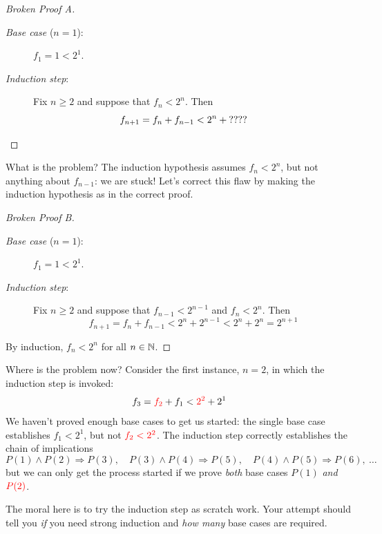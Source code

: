 \begin{proof}[Broken Proof A]
	\begin{description}
		\item[\normalfont\emph{Base case} ($n=1$):] $f_1=1<2^1$.
		\item[\normalfont\emph{Induction step}:] Fix $n\ge 2$ and suppose that $f_n<2^n$. Then\footnotemark
		\[
			f_{n+1}=f_n+f_{n-1}<2^n+\text{????} \tag*{\phantom{\qedhere}}
		\]
	\end{description} 
\end{proof}

	
What is the problem? The induction hypothesis assumes $f_n<2^n$, but not anything about $f_{n-1}$: we are stuck! Let's correct this flaw by making the induction hypothesis as in the correct proof.

\begin{proof}[Broken Proof B]
	\begin{description}
		\item[\normalfont\emph{Base case} ($n=1$):] $f_1=1<2^1$.
		\item[\normalfont\emph{Induction step}:] Fix $n\ge 2$ and suppose that $f_{n-1}<2^{n-1}$ and $f_n<2^n$. Then
		\[
			f_{n+1}=f_n+f_{n-1}<2^n+2^{n-1}<2^n+2^n=2^{n+1}
		\]
	\end{description} 
	By induction, $f_n<2^n$ for all $n\in\mathbb{N}$.\phantom{\qedhere}
\end{proof}

Where is the problem now? Consider the first instance, $n=2$, in which the induction step is invoked:
\[
	f_3=\textcolor{red}{f_2}+f_1<\textcolor{red}{2^2}+2^1
\] 
We haven't proved enough base cases to get us started: the single base case establishes $f_1<2^1$, but not $\textcolor{red}{f_2<2^2}$. The induction step correctly establishes the chain of implications
\[
	P(1)\wedge P(2)\Longrightarrow P(3),\quad P(3)\wedge P(4)\Longrightarrow P(5),\quad P(4)\wedge P(5)\Longrightarrow P(6),\ \ldots
\]
but we can only get the process started if we prove \emph{both} base cases $P(1)$ \emph{and} $\textcolor{red}{P(2)}$.\smallbreak

The moral here is to try the induction step as scratch work. Your attempt should tell you \emph{if} you need strong induction and \emph{how many} base cases are required.


